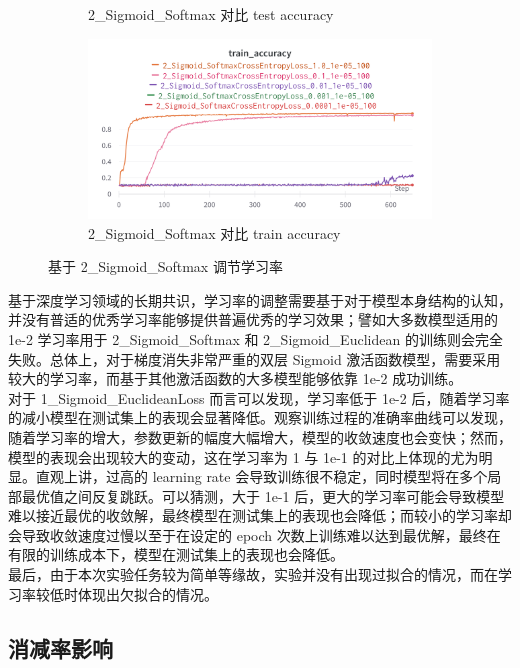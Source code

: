 \documentclass{article}
\begin{document}
\begin{figure}[htbp]
\begin{subfigure}{0.475\textwidth}
		\caption{2\_Sigmoid\_Softmax 对比 test accuracy}
	\end{subfigure}
	\begin{subfigure}{0.475\textwidth}
		\centering
		\includegraphics[width=1\textwidth]{../pics/学习率_2_Sigmoid_Softmax_train_acc.png}
		\caption{2\_Sigmoid\_Softmax 对比 train accuracy}
	\end{subfigure}
	\caption{基于 2\_Sigmoid\_Softmax 调节学习率}
	\label{fig:8}
\end{figure}

基于深度学习领域的长期共识，学习率的调整需要基于对于模型本身结构的认知，并没有普适的优秀学习率能够提供普遍优秀的学习效果；譬如大多数模型适用的 1e-2 学习率用于 2\_Sigmoid\_Softmax 和 2\_Sigmoid\_Euclidean 的训练则会完全失败。总体上，对于梯度消失非常严重的双层 Sigmoid 激活函数模型，需要采用较大的学习率，而基于其他激活函数的大多模型能够依靠 1e-2 成功训练。
\\
对于 1\_Sigmoid\_EuclideanLoss 而言可以发现，学习率低于 1e-2 后，随着学习率的减小模型在测试集上的表现会显著降低。观察训练过程的准确率曲线可以发现，随着学习率的增大，参数更新的幅度大幅增大，模型的收敛速度也会变快；然而，模型的表现会出现较大的变动，这在学习率为 1 与 1e-1 的对比上体现的尤为明显。直观上讲，过高的 learning rate 会导致训练很不稳定，同时模型将在多个局部最优值之间反复跳跃。可以猜测，大于 1e-1 后，更大的学习率可能会导致模型难以接近最优的收敛解，最终模型在测试集上的表现也会降低；而较小的学习率却会导致收敛速度过慢以至于在设定的 epoch 次数上训练难以达到最优解，最终在有限的训练成本下，模型在测试集上的表现也会降低。
\\最后，由于本次实验任务较为简单等缘故，实验并没有出现过拟合的情况，而在学习率较低时体现出欠拟合的情况。

\subsection{消减率影响}
\end{document}
